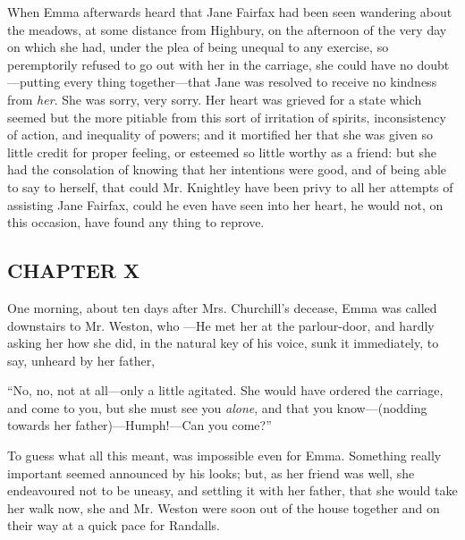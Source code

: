 When Emma afterwards heard that Jane Fairfax had been seen wandering about the meadows, at some distance from Highbury, on the afternoon of the very day on which she had, under the plea of being unequal to any exercise, so peremptorily refused to go out with her in the carriage, she could have no doubt---putting every thing together---that Jane was resolved to receive no kindness from {\em her}. She was sorry, very sorry. Her heart was grieved for a state which seemed but the more pitiable from this sort of irritation of spirits, inconsistency of action, and inequality of powers; and it mortified her that she was given so little credit for proper feeling, or esteemed so little worthy as a friend: but she had the consolation of knowing that her intentions were good, and of being able to say to herself, that could Mr. Knightley have been privy to all her attempts of assisting Jane Fairfax, could he even have seen into her heart, he would not, on this occasion, have found any thing to reprove.

\subsection[chapter-x-2]{\useURL[url48][][][]\from[url48]CHAPTER X}

One morning, about ten days after Mrs. Churchill's decease, Emma was called downstairs to Mr. Weston, who ---He met her at the parlour-door, and hardly asking her how she did, in the natural key of his voice, sunk it immediately, to say, unheard by her father,



“No, no, not at all---only a little agitated. She would have ordered the carriage, and come to you, but she must see you {\em alone}, and that you know---(nodding towards her father)---Humph!---Can you come?”



To guess what all this meant, was impossible even for Emma. Something really important seemed announced by his looks; but, as her friend was well, she endeavoured not to be uneasy, and settling it with her father, that she would take her walk now, she and Mr. Weston were soon out of the house together and on their way at a quick pace for Randalls.

